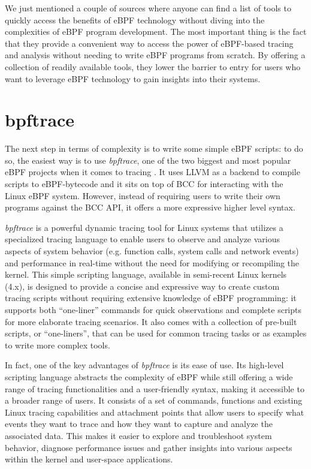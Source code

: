 We just mentioned a couple of sources where anyone can find a list of tools to quickly access the benefits of eBPF technology without diving into the complexities of eBPF program development.
The most important thing is the fact that they provide a convenient way to access the power of eBPF-based tracing and analysis without needing to write eBPF programs from scratch. 
By offering a collection of readily available tools, they lower the barrier to entry for users who want to leverage eBPF technology to gain insights into their systems.

\section{bpftrace}

The next step in terms of complexity is to write some simple eBPF scripts: to do so, the easiest way is to use \textit{bpftrace}, one of the two biggest and most popular eBPF projects when it comes to tracing \cite{bpftraceRepo}.
It uses LLVM as a backend to compile scripts to eBPF-bytecode and it sits on top of BCC for interacting with the Linux eBPF system.
However, instead of requiring users to write their own programs against the BCC API, it offers a more expressive higher level syntax.

\textit{bpftrace} is a powerful dynamic tracing tool for Linux systems that utilizes a specialized tracing language to enable users to observe and analyze various aspects of system behavior (e.g. function calls, system calls and network events) and performance in real-time without the need for modifying or recompiling the kernel.
This simple scripting language, available in semi-recent Linux kernels (4.x), is designed to provide a concise and expressive way to create custom tracing scripts without requiring extensive knowledge of eBPF programming: it supports both ``one-liner'' commands for quick observations and complete scripts for more elaborate tracing scenarios.
It also comes with a collection of pre-built scripts, or ``one-liners'', that can be used for common tracing tasks or as examples to write more complex tools. 

In fact, one of the key advantages of \textit{bpftrace} is its ease of use. 
Its high-level scripting language abstracts the complexity of eBPF while still offering a wide range of tracing functionalities and a user-friendly syntax, making it accessible to a broader range of users. 
It consists of a set of commands, functions and existing Linux tracing capabilities and attachment points that allow users to specify what events they want to trace and how they want to capture and analyze the associated data.
This makes it easier to explore and troubleshoot system behavior, diagnose performance issues and gather insights into various aspects within the kernel and user-space applications.

